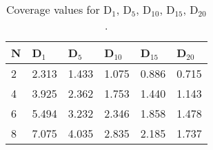 \begin{table}[t!]
	\small
	\caption{Coverage values for D$_{1}$, D$_{5}$, D$_{10}$, D$_{15}$, D$_{20}$.}
	\begin{tabular}{|l|p{0.95cm}|p{0.95cm}|p{0.95cm}|p{0.95cm}|p{0.95cm}|}
		\hline
		
\textbf{N} & \textbf{ D$_{1}$} & \textbf{D$_{5}$} & \textbf{ D$_{10}$} & \textbf{D$_{15}$} & \textbf{D$_{20}$} \\ \hline
		2                & 2.313                                                                    & 1.433                                                                    & 1.075                                                                     & 0.886                                                                     & 0.715                                                                     \\ \hline
		4                & 3.925                                                                    & 2.362                                                                    & 1.753                                                                     & 1.440                                                                     & 1.143                                                                     \\ \hline
		6                & 5.494                                                                    & 3.232                                                                    & 2.346                                                                     & 1.858                                                                     & 1.478                                                                     \\ \hline
		8                & 7.075                                                                    & 4.035                                                                    & 2.835                                                                     & 2.185                                                                     & 1.737                                                                     \\ \hline

\end{tabular}
\end{table}
